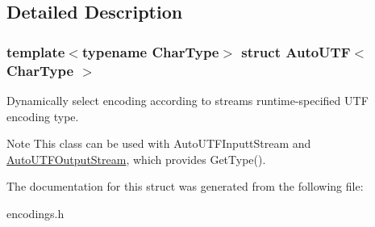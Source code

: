\subsection{Detailed Description}
\subsubsection*{template$<$typename Char\+Type$>$\newline
struct Auto\+U\+T\+F$<$ Char\+Type $>$}

Dynamically select encoding according to stream\textquotesingle{}s runtime-\/specified U\+TF encoding type. 

\begin{DoxyNote}{Note}
This class can be used with Auto\+U\+T\+F\+Inputt\+Stream and \hyperlink{a02140}{Auto\+U\+T\+F\+Output\+Stream}, which provides Get\+Type(). 
\end{DoxyNote}


The documentation for this struct was generated from the following file\+:\begin{DoxyCompactItemize}
\item 
encodings.\+h\end{DoxyCompactItemize}

